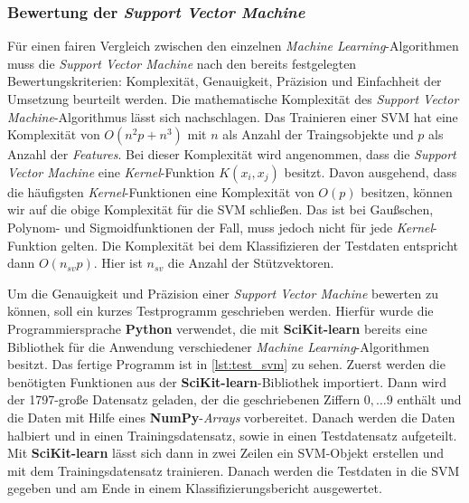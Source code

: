 \subsubsection{Bewertung der \textit{Support Vector Machine}}
Für einen fairen Vergleich zwischen den einzelnen \textit{Machine Learning}-Algorithmen muss die \textit{Support Vector Machine}
nach den bereits festgelegten Bewertungskriterien: Komplexität, Genauigkeit, Präzision und Einfachheit der Umsetzung beurteilt werden.
Die mathematische Komplexität des \textit{Support Vector Machine}-Algorithmus lässt sich nachschlagen.
Das Trainieren einer SVM hat eine Komplexität von $O(n^2 p + n^3)$ mit $n$ als Anzahl der Traingsobjekte und $p$ als Anzahl der \textit{Features}.
Bei dieser Komplexität wird angenommen, dass die \textit{Support Vector Machine} eine \textit{Kernel}-Funktion $K(x_i, x_j)$ besitzt.
Davon ausgehend, dass die häufigsten \textit{Kernel}-Funktionen eine Komplexität von $O(p)$ besitzen, können wir auf die obige Komplexität
für die SVM schließen. Das ist bei Gaußschen, Polynom- und Sigmoidfunktionen der Fall, muss jedoch nicht für jede \textit{Kernel}-Funktion gelten.
Die Komplexität bei dem Klassifizieren der Testdaten entspricht dann $O(n_{sv} p)$. Hier ist $n_{sv}$ die Anzahl der Stützvektoren.\cite{complexity}

Um die Genauigkeit und Präzision einer \textit{Support Vector Machine} bewerten zu können, soll ein kurzes Testprogramm geschrieben werden.
Hierfür wurde die Programmiersprache \textbf{Python} verwendet, die mit \textbf{SciKit-learn} bereits eine Bibliothek für die Anwendung 
verschiedener \textit{Machine Learning}-Algorithmen besitzt. Das fertige Programm ist in \ref{lst:test_svm} zu sehen.
Zuerst werden die benötigten Funktionen aus der \textbf{SciKit-learn}-Bibliothek importiert. Dann wird der 1797-große Datensatz geladen, der die
geschriebenen Ziffern $0, \dots 9$ enthält und die Daten mit Hilfe eines \textbf{NumPy}-\textit{Arrays} vorbereitet. Danach werden die Daten halbiert und in einen
Trainingsdatensatz, sowie in einen Testdatensatz aufgeteilt. Mit \textbf{SciKit-learn} lässt sich dann in zwei Zeilen ein SVM-Objekt erstellen und
mit dem Trainingsdatensatz trainieren. Danach werden die Testdaten in die SVM gegeben und am Ende in einem Klassifizierungsbericht ausgewertet.

